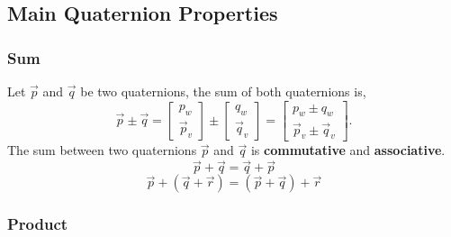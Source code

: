 \subsection{Main Quaternion Properties}
\subsubsection{Sum}

Let $\Vec{p}$ and $\Vec{q}$ be two quaternions, the sum of both quaternions is,
%
\begin{equation}
  \Vec{p} \pm \Vec{q} =
  \begin{bmatrix} p_w \\ \Vec{p}_{v} \end{bmatrix}
  \pm
  \begin{bmatrix} q_w \\ \Vec{q}_{v} \end{bmatrix} =
  \begin{bmatrix} p_w \pm q_w \\ \Vec{p}_{v} \pm \Vec{q}_{v} \end{bmatrix}.
\end{equation}
%
The sum between two quaternions $\Vec{p}$ and $\Vec{q}$ is \textbf{commutative}
and \textbf{associative}.
%
\begin{equation}
  \Vec{p} + \Vec{q} = \Vec{q} + \Vec{p}
\end{equation}
%
\begin{equation}
  \Vec{p} + (\Vec{q} + \Vec{r}) = (\Vec{p} + \Vec{q}) + \Vec{r}
\end{equation}


\subsubsection{Product}

